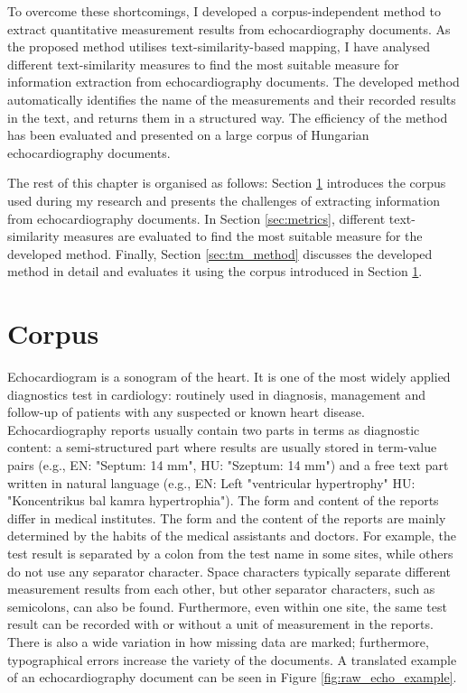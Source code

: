 \vspace{0.5cm}
To overcome these shortcomings, I developed a corpus-independent method to extract quantitative measurement results from echocardiography documents. As the proposed method utilises text-similarity-based mapping, I have analysed different text-similarity measures to find the most suitable measure for information extraction from echocardiography documents. The developed method automatically identifies the name of the measurements and their recorded results in the text, and returns them in a structured way. The efficiency of the method has been evaluated and presented on a large corpus of Hungarian echocardiography documents.

\vspace{0.5cm}
The rest of this chapter is organised as follows: Section \ref{sec:corpus} introduces the corpus used during my research and presents the challenges of extracting information from echocardiography documents. In Section \ref{sec:metrics}, different text-similarity measures are evaluated to find the most suitable measure for the developed method. Finally, Section \ref{sec:tm_method} discusses the developed method in detail and evaluates it using the corpus introduced in Section \ref{sec:corpus}.

\section{Corpus}
\label{sec:corpus}

Echocardiogram is a sonogram of the heart. It is one of the most widely applied diagnostics test in cardiology: routinely used in diagnosis, management and follow-up of patients with any suspected or known heart disease. Echocardiography reports usually contain two parts in terms as diagnostic content: a semi-structured part where results are usually stored in term-value pairs (e.g., EN: "Septum: 14 mm", HU: "Szeptum: 14 mm") and a free text part written in natural language (e.g., EN: Left "ventricular hypertrophy" HU: "Koncentrikus bal kamra hypertrophia"). The form and content of the reports differ in medical institutes. The form and the content of the reports are mainly determined by the habits of the medical assistants and doctors. For example, the test result is separated by a colon from the test name in some sites, while others do not use any separator character. Space characters typically separate different measurement results from each other, but other separator characters, such as semicolons, can also be found. Furthermore, even within one site, the same test result can be recorded with or without a unit of measurement in the reports. There is also a wide variation in how missing data are marked; furthermore, typographical errors increase the variety of the documents. A translated example of an echocardiography document can be seen in Figure \ref{fig:raw_echo_example}.

